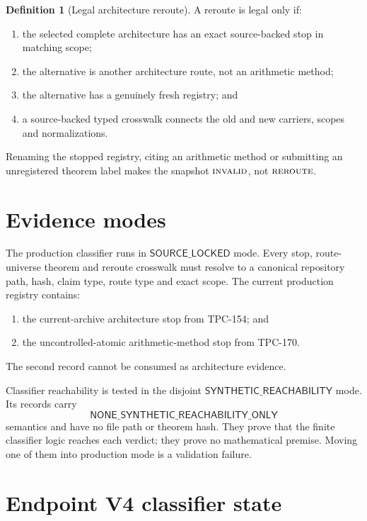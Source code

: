 \documentclass[11pt]{article}
\theoremstyle{definition}
\newtheorem{definition}[theorem]{Definition}
\theoremstyle{remark}
\newcommand{\REROUTE}{\textnormal{\textsc{reroute}}}
\newcommand{\INVALID}{\textnormal{\textsc{invalid}}}
\begin{document}
\begin{definition}[Legal architecture reroute]
\label{def:reroute}
A reroute is legal only if:
\begin{enumerate}[label=(\roman*),leftmargin=2.2em]
\item the selected complete architecture has an exact source-backed
  stop in matching scope;
\item the alternative is another architecture route, not an
  arithmetic method;
\item the alternative has a genuinely fresh registry; and
\item a source-backed typed crosswalk connects the old and new
  carriers, scopes and normalizations.
\end{enumerate}
\end{definition}

Renaming the stopped registry, citing an arithmetic method or
submitting an unregistered theorem label makes the snapshot
\(\INVALID\), not \(\REROUTE\).

\section{Evidence modes}

The production classifier runs in
\(\mathsf{SOURCE\_LOCKED}\) mode.  Every stop, route-universe theorem
and reroute crosswalk must resolve to a canonical repository path,
hash, claim type, route type and exact scope.  The current production
registry contains:
\begin{enumerate}[leftmargin=2em]
\item the current-archive architecture stop from TPC-154; and
\item the uncontrolled-atomic arithmetic-method stop from TPC-170.
\end{enumerate}
The second record cannot be consumed as architecture evidence.

Classifier reachability is tested in the disjoint
\(\mathsf{SYNTHETIC\_REACHABILITY}\) mode.  Its records carry
\[
 \mathsf{NONE\_SYNTHETIC\_REACHABILITY\_ONLY}
\tag{9}\label{eq:synthetic}
\]
semantics and have no file path or theorem hash.  They prove that the
finite classifier logic reaches each verdict; they prove no
mathematical premise.  Moving one of them into production mode is a
validation failure.

\section{Endpoint V4 classifier state}
\end{document}
